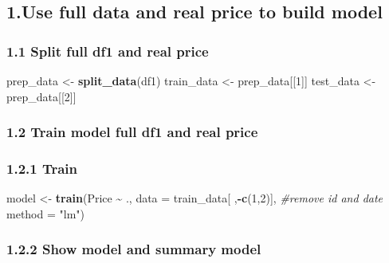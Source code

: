 \documentclass[
]{article}
\newenvironment{Shaded}{\begin{snugshade}}{\end{snugshade}}
\newcommand{\AttributeTok}[1]{\textcolor[rgb]{0.13,0.29,0.53}{#1}}
\newcommand{\CommentTok}[1]{\textcolor[rgb]{0.56,0.35,0.01}{\textit{#1}}}
\newcommand{\DecValTok}[1]{\textcolor[rgb]{0.00,0.00,0.81}{#1}}
\newcommand{\FunctionTok}[1]{\textcolor[rgb]{0.13,0.29,0.53}{\textbf{#1}}}
\newcommand{\NormalTok}[1]{#1}
\newcommand{\OtherTok}[1]{\textcolor[rgb]{0.56,0.35,0.01}{#1}}
\newcommand{\SpecialCharTok}[1]{\textcolor[rgb]{0.81,0.36,0.00}{\textbf{#1}}}
\newcommand{\StringTok}[1]{\textcolor[rgb]{0.31,0.60,0.02}{#1}}
\begin{document}
\hypertarget{use-full-data-and-real-price-to-build-model}{%
\subsection{1.Use full data and real price to build
model}\label{use-full-data-and-real-price-to-build-model}}

\hypertarget{split-full-df1-and-real-price}{%
\subsubsection{1.1 Split full df1 and real
price}\label{split-full-df1-and-real-price}}

\begin{Shaded}
\begin{Highlighting}[]
\NormalTok{prep\_data }\OtherTok{\textless{}{-}} \FunctionTok{split\_data}\NormalTok{(df1)}
\NormalTok{train\_data }\OtherTok{\textless{}{-}}\NormalTok{ prep\_data[[}\DecValTok{1}\NormalTok{]]}
\NormalTok{test\_data }\OtherTok{\textless{}{-}}\NormalTok{ prep\_data[[}\DecValTok{2}\NormalTok{]]}
\end{Highlighting}
\end{Shaded}

\hypertarget{train-model-full-df1-and-real-price}{%
\subsubsection{1.2 Train model full df1 and real
price}\label{train-model-full-df1-and-real-price}}

\hypertarget{train}{%
\subsubsection{1.2.1 Train}\label{train}}

\begin{Shaded}
\begin{Highlighting}[]
\NormalTok{model }\OtherTok{\textless{}{-}} \FunctionTok{train}\NormalTok{(Price }\SpecialCharTok{\textasciitilde{}}\NormalTok{ .,}
               \AttributeTok{data =}\NormalTok{ train\_data[ ,}\SpecialCharTok{{-}}\FunctionTok{c}\NormalTok{(}\DecValTok{1}\NormalTok{,}\DecValTok{2}\NormalTok{)], }\CommentTok{\#remove id and date}
               \AttributeTok{method =} \StringTok{"lm"}\NormalTok{)}
\end{Highlighting}
\end{Shaded}

\hypertarget{show-model-and-summary-model}{%
\subsubsection{1.2.2 Show model and summary
model}\label{show-model-and-summary-model}}
\end{document}
